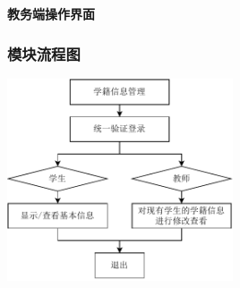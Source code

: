 \documentclass{article}
\begin{document}
\begin{center}
\textbf{教务端操作界面}
\end{center}

\subsubsection{模块流程图}
\begin{center}
\includegraphics[width=0.5\textwidth]{fig/studentStatus (1).pdf}
\end{center}
\end{document}

